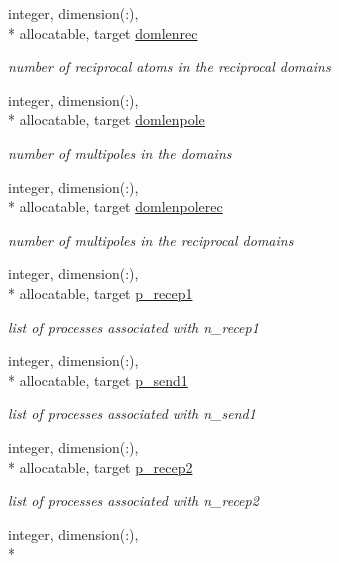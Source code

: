 \begin{DoxyCompactItemize}
integer, dimension(\-:), \\*
allocatable, target \hyperlink{classdomdec_aa797f77d936208ae42bc625d8a581f9f}{domlenrec}
\begin{DoxyCompactList}\small\item\em number of reciprocal atoms in the reciprocal domains \end{DoxyCompactList}\item 
integer, dimension(\-:), \\*
allocatable, target \hyperlink{classdomdec_af2817bfda7f51346104df393ac0549a7}{domlenpole}
\begin{DoxyCompactList}\small\item\em number of multipoles in the domains \end{DoxyCompactList}\item 
integer, dimension(\-:), \\*
allocatable, target \hyperlink{classdomdec_a44f522e557be333b75aac44b3ec5b28b}{domlenpolerec}
\begin{DoxyCompactList}\small\item\em number of multipoles in the reciprocal domains \end{DoxyCompactList}\item 
integer, dimension(\-:), \\*
allocatable, target \hyperlink{classdomdec_aecd0d700c25dd92b90c3aff9ef2675d7}{p\-\_\-recep1}
\begin{DoxyCompactList}\small\item\em list of processes associated with n\-\_\-recep1 \end{DoxyCompactList}\item 
integer, dimension(\-:), \\*
allocatable, target \hyperlink{classdomdec_a1d393373b27051c32983ecf341da6163}{p\-\_\-send1}
\begin{DoxyCompactList}\small\item\em list of processes associated with n\-\_\-send1 \end{DoxyCompactList}\item 
integer, dimension(\-:), \\*
allocatable, target \hyperlink{classdomdec_a713d6b0f5bb76b694b14d466e89e29dd}{p\-\_\-recep2}
\begin{DoxyCompactList}\small\item\em list of processes associated with n\-\_\-recep2 \end{DoxyCompactList}\item 
integer, dimension(\-:), \\*

\end{DoxyCompactItemize}
